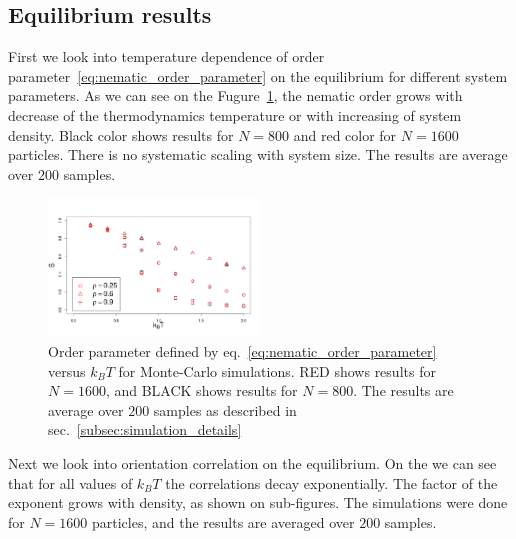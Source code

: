 \subsection{Equilibrium results}
\label{subsec:monte_carlo_results}
First we look into temperature dependence of order parameter~\eqref{eq:nematic_order_parameter} on the equilibrium for different system parameters. As we can see on the Fugure~\ref{fig:op_kbt}, the nematic order grows with decrease of the thermodynamics temperature or with increasing of system density. Black color shows results for $N = 800$ and red color for $N = 1600$ particles. There is no systematic scaling with system size. The results are average over $200$ samples.

\begin{figure}[h]
	\centering
	\includegraphics[width=0.5\textwidth]{Images/op_vs_kbt_MC}
	\captionsetup{justification=centering, width=0.9\columnwidth}
	\caption{Order parameter defined by eq.~\eqref{eq:nematic_order_parameter} versus $k_BT$ for Monte-Carlo simulations. RED shows results for $N = 1600$, and BLACK shows results for $N = 800$. The results are average over $200$ samples as described in sec.~\ref{subsec:simulation_details}}
	\label{fig:op_kbt}
\end{figure}

Next we look into orientation correlation on the equilibrium. On the  we can see that for all values of $k_BT$ the correlations decay exponentially. The factor of the exponent grows with density, as shown on sub-figures. The simulations were done for $N = 1600$ particles, and the results are averaged over $200$ samples.

